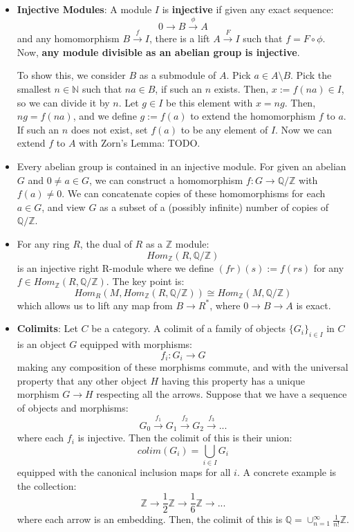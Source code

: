 \documentclass[11pt, oneside]{amsart}   	%
\theoremstyle{definition}
\begin{document}
\begin{itemize}
	\item \textbf{Injective Modules}: A module $I$ is \textbf{injective} if given any exact sequence:
	$$
		0\rightarrow B\xrightarrow{\phi} A
	$$
	and any homomorphism $B\xrightarrow{f} I$, there is a lift $A\xrightarrow{F} I$ such that $f = F\circ\phi$. Now, \textbf{any module divisible as an 
	abelian group is injective}.
	
	To show this, we consider $B$ as a submodule of $A$. Pick $a\in A\setminus B$. Pick the smallest $n\in\mathbb N$ such that $na\in B$, if such an 
	$n$ exists. Then, $x := f(na)\in I$, so we can divide it by $n$. Let $g\in I$ be this element with $x = ng$. Then, $ng = f(na)$, and we define $g := f(a)$ 
	to extend the homomorphism $f$ to $a$. If such an $n$ does not exist, set $f(a)$ to be any element of $I$. Now we can extend $f$ to $A$ with 
	Zorn's Lemma: TODO.
	
	\item Every abelian group is contained in an injective module. For given an abelian $G$ and $0\neq a\in G$, we can construct a homomorphism 
	$f: G\rightarrow \mathbb Q / \mathbb Z$ with $f(a)\neq 0$. We can concatenate copies of these homomorphisms for each $a\in G$, and view 
	$G$ as a subset of a (possibly infinite) number of copies of $\mathbb Q / \mathbb Z$. 
	
	\item For any ring $R$, the dual of $R$ as a $\mathbb Z$ module: 
	$$
		Hom_\mathbb{Z}(R, \mathbb Q / \mathbb Z)
	$$
	is an injective right R-module where we define $(fr)(s) := f(rs)$ for any $f\in Hom_{\mathbb Z}(R, \mathbb Q / \mathbb Z)$. The key point is:
	$$
		Hom_R(M, Hom_\mathbb{Z}(R, \mathbb Q / \mathbb Z))\cong Hom_\mathbb{Z}(M, \mathbb Q / \mathbb Z)
	$$
	which allows us to lift any map from $B\rightarrow R^*$, where $0\rightarrow B\rightarrow A$ is exact. 
	
	\item \textbf{Colimits}: Let $C$ be a category. A colimit of a family of objects $\{G_i\}_{i\in I}$ in $C$ is an object $G$ equipped with morphisms:
	$$
		f_i : G_i\rightarrow G
	$$
	making any composition of these morphisms commute, and with the universal property that any other object $H$ having this property has a unique 
	morphism $G\rightarrow H$ respecting all the arrows. Suppose that we have a sequence of objects and morphisms:
	$$
		G_0\xrightarrow{f_1} G_1 \xrightarrow{f_2} G_2\xrightarrow{f_3}...
	$$
	where each $f_i$ is injective. Then the colimit of this is their union:
	$$
		colim (G_i) = \bigcup_{i\in I}G_i
	$$
	equipped with the canonical inclusion maps for all $i$. A concrete example is the collection:
	$$
		\mathbb Z\rightarrow \frac{1}{2}\mathbb Z\rightarrow \frac{1}{6}\mathbb Z\rightarrow ...
	$$
	where each arrow is an embedding. Then, the colimit of this is $\mathbb Q = \cup_{n = 1}^\infty\frac{1}{n!}\mathbb Z$.
	

\end{itemize}
\end{document}

